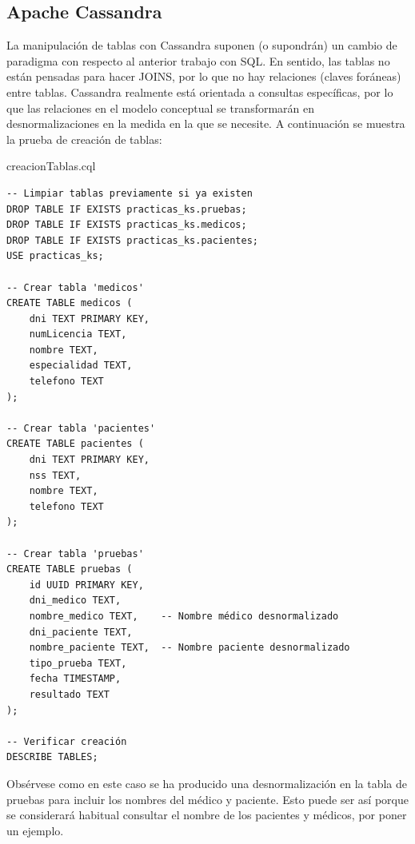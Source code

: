 \documentclass{article}
\begin{document}
\subsection{Apache Cassandra}\label{subsec: Apache Cassandra}
La manipulación de tablas con Cassandra suponen (o supondrán) un cambio de paradigma con respecto al anterior trabajo con SQL. En sentido, las tablas no están pensadas para hacer JOINS, por lo que no hay relaciones (claves foráneas) entre tablas. Cassandra realmente está orientada a consultas específicas, por lo que las relaciones en el modelo conceptual se transformarán en desnormalizaciones en la medida en la que se necesite. A continuación se muestra la prueba de creación de tablas:
\begin{scriptbox}{creacionTablas.cql}
\begin{verbatim}
-- Limpiar tablas previamente si ya existen 
DROP TABLE IF EXISTS practicas_ks.pruebas;
DROP TABLE IF EXISTS practicas_ks.medicos;
DROP TABLE IF EXISTS practicas_ks.pacientes;
USE practicas_ks;

-- Crear tabla 'medicos' 
CREATE TABLE medicos (
    dni TEXT PRIMARY KEY,
    numLicencia TEXT,
    nombre TEXT,
    especialidad TEXT,
    telefono TEXT
);

-- Crear tabla 'pacientes' 
CREATE TABLE pacientes (
    dni TEXT PRIMARY KEY,
    nss TEXT,
    nombre TEXT,
    telefono TEXT
);

-- Crear tabla 'pruebas' 
CREATE TABLE pruebas (
    id UUID PRIMARY KEY,
    dni_medico TEXT,
    nombre_medico TEXT,    -- Nombre médico desnormalizado
    dni_paciente TEXT,
    nombre_paciente TEXT,  -- Nombre paciente desnormalizado
    tipo_prueba TEXT,
    fecha TIMESTAMP,
    resultado TEXT
);

-- Verificar creación
DESCRIBE TABLES;

\end{verbatim}
\end{scriptbox}

Obsérvese como en este caso se ha producido una desnormalización en la tabla de pruebas para incluir los nombres del médico y paciente. Esto puede ser así porque se considerará habitual consultar el nombre de los pacientes y médicos, por poner un ejemplo.
\end{document}
